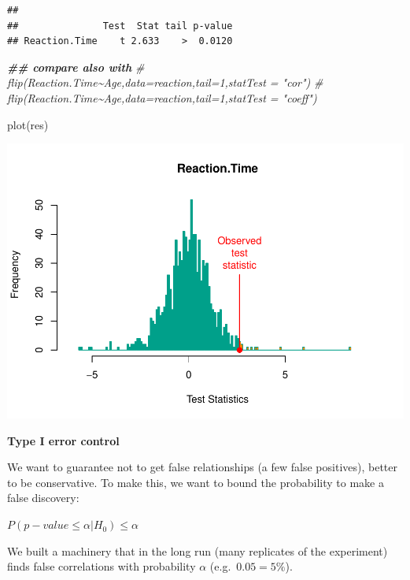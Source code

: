 \documentclass[
]{article}
\newenvironment{Shaded}{\begin{snugshade}}{\end{snugshade}}
\newcommand{\CommentTok}[1]{\textcolor[rgb]{0.56,0.35,0.01}{\textit{#1}}}
\newcommand{\DocumentationTok}[1]{\textcolor[rgb]{0.56,0.35,0.01}{\textbf{\textit{#1}}}}
\newcommand{\FunctionTok}[1]{\textcolor[rgb]{0.00,0.00,0.00}{#1}}
\newcommand{\NormalTok}[1]{#1}
\begin{document}
\begin{verbatim}
## 
##               Test  Stat tail p-value
## Reaction.Time    t 2.633    >  0.0120
\end{verbatim}

\begin{Shaded}
\begin{Highlighting}[]
\DocumentationTok{\#\# compare also with}
\CommentTok{\# flip(Reaction.Time\textasciitilde{}Age,data=reaction,tail=1,statTest = "cor")}
\CommentTok{\# flip(Reaction.Time\textasciitilde{}Age,data=reaction,tail=1,statTest = "coeff")}
\end{Highlighting}
\end{Shaded}

\begin{Shaded}
\begin{Highlighting}[]
\FunctionTok{plot}\NormalTok{(res)}
\end{Highlighting}
\end{Shaded}

\begin{center}\includegraphics{perm_files/figure-latex/unnamed-chunk-15-1} \end{center}

\textbf{Type I error control}

We want to guarantee not to get false relationships (a few false
positives), better to be conservative. To make this, we want to bound
the probability to make a false discovery:

\(P (p-value \leq \alpha | H_0) \leq \alpha\)

We built a machinery that in the long run (many replicates of the
experiment) finds false correlations with probability \(\alpha\)
(e.g.~\(0.05=5\%\)).
\end{document}
